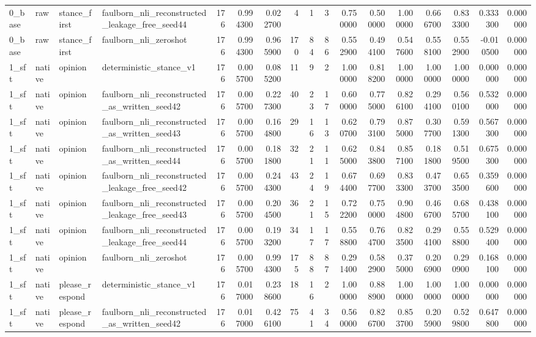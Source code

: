 \begin{tabular}{llllrrrrrrrrrrrrr}
0_base & raw & stance_first & faulborn_nli_reconstructed_leakage_free_seed44 & 176 & 0.994300 & 0.022700 & 4 & 1 & 3 & 0.750000 & 0.500000 & 1.000000 & 0.666700 & 0.833300 & 0.333300 & 0.000000 \\
0_base & raw & stance_first & faulborn_nli_zeroshot & 176 & 0.994300 & 0.965900 & 170 & 84 & 86 & 0.552900 & 0.494100 & 0.547600 & 0.558100 & 0.552900 & -0.010500 & 0.000000 \\
1_sft & native & opinion & deterministic_stance_v1 & 176 & 0.005700 & 0.085200 & 11 & 9 & 2 & 1.000000 & 0.818200 & 1.000000 & 1.000000 & 1.000000 & 0.000000 & 0.000000 \\
1_sft & native & opinion & faulborn_nli_reconstructed_as_written_seed42 & 176 & 0.005700 & 0.227300 & 40 & 23 & 17 & 0.600000 & 0.775000 & 0.826100 & 0.294100 & 0.560100 & 0.532000 & 0.000000 \\
1_sft & native & opinion & faulborn_nli_reconstructed_as_written_seed43 & 176 & 0.005700 & 0.164800 & 29 & 16 & 13 & 0.620700 & 0.793100 & 0.875000 & 0.307700 & 0.591300 & 0.567300 & 0.000000 \\
1_sft & native & opinion & faulborn_nli_reconstructed_as_written_seed44 & 176 & 0.005700 & 0.181800 & 32 & 21 & 11 & 0.625000 & 0.843800 & 0.857100 & 0.181800 & 0.519500 & 0.675300 & 0.000000 \\
1_sft & native & opinion & faulborn_nli_reconstructed_leakage_free_seed42 & 176 & 0.005700 & 0.244300 & 43 & 24 & 19 & 0.674400 & 0.697700 & 0.833300 & 0.473700 & 0.653500 & 0.359600 & 0.000000 \\
1_sft & native & opinion & faulborn_nli_reconstructed_leakage_free_seed43 & 176 & 0.005700 & 0.204500 & 36 & 21 & 15 & 0.722200 & 0.750000 & 0.904800 & 0.466700 & 0.685700 & 0.438100 & 0.000000 \\
1_sft & native & opinion & faulborn_nli_reconstructed_leakage_free_seed44 & 176 & 0.005700 & 0.193200 & 34 & 17 & 17 & 0.558800 & 0.764700 & 0.823500 & 0.294100 & 0.558800 & 0.529400 & 0.000000 \\
1_sft & native & opinion & faulborn_nli_zeroshot & 176 & 0.005700 & 0.994300 & 175 & 88 & 87 & 0.291400 & 0.582900 & 0.375000 & 0.206900 & 0.290900 & 0.168100 & 0.000000 \\
1_sft & native & please_respond & deterministic_stance_v1 & 176 & 0.017000 & 0.238600 & 18 & 16 & 2 & 1.000000 & 0.888900 & 1.000000 & 1.000000 & 1.000000 & 0.000000 & 0.000000 \\
1_sft & native & please_respond & faulborn_nli_reconstructed_as_written_seed42 & 176 & 0.017000 & 0.426100 & 75 & 41 & 34 & 0.560000 & 0.826700 & 0.853700 & 0.205900 & 0.529800 & 0.647800 & 0.000000 \\

\end{tabular}
